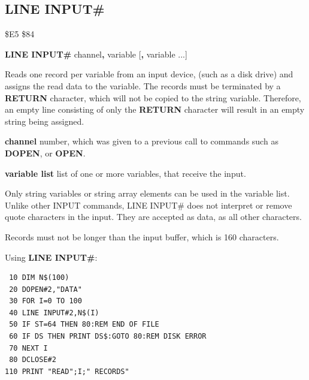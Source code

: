 \subsection{LINE INPUT\#}
\begin{description}[leftmargin=2cm,style=nextline]
\item [Token:] \$E5 \$84
\item [Format:] {\bf LINE INPUT\#} channel{\bf,} variable [{\bf,} variable ...]
\item [Usage:] Reads one record per variable from an input device,
              (such as a disk drive)
               and assigns the read data to the variable.
               The records must be terminated by a {\bf RETURN}
               character, which will not be copied to the string variable.
               Therefore, an empty line consisting of only the {\bf RETURN} character
               will result in an empty string being assigned.

               {\bf channel} number, which was given to a previous
               call to commands such as {\bf DOPEN}, or {\bf OPEN}.

               {\bf variable list} list of one or more
               variables, that receive the input.

\item [Remarks:] Only string variables or string array elements
                 can be used in the variable list.
                 Unlike other INPUT commands, {LINE INPUT\#} does
                 not interpret or remove quote characters in the input.
                 They are accepted as data, as all other characters.

                 Records must not be longer than the input buffer, which is 160 characters.

\item [Example:] Using {\bf LINE INPUT\#}:
\begin{tcolorbox}[colback=black,coltext=white]
\verbatimfont{\codefont}
\begin{verbatim}
 10 DIM N$(100)
 20 DOPEN#2,"DATA"
 30 FOR I=0 TO 100
 40 LINE INPUT#2,N$(I)
 50 IF ST=64 THEN 80:REM END OF FILE
 60 IF DS THEN PRINT DS$:GOTO 80:REM DISK ERROR
 70 NEXT I
 80 DCLOSE#2
110 PRINT "READ";I;" RECORDS"
\end{verbatim}
\end{tcolorbox}
\end{description}

\label{basic65-list}
\newpage
